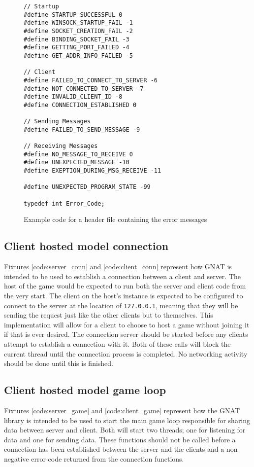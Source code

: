 \begin{figure}[!h]
  \centering
\begin{lstlisting}
// Startup
#define STARTUP_SUCCESSFUL 0
#define WINSOCK_STARTUP_FAIL -1
#define SOCKET_CREATION_FAIL -2
#define BINDING_SOCKET_FAIL -3
#define GETTING_PORT_FAILED -4
#define GET_ADDR_INFO_FAILED -5

// Client
#define FAILED_TO_CONNECT_TO_SERVER -6
#define NOT_CONNECTED_TO_SERVER -7
#define INVALID_CLIENT_ID -8
#define CONNECTION_ESTABLISHED 0

// Sending Messages
#define FAILED_TO_SEND_MESSAGE -9

// Receiving Messages
#define NO_MESSAGE_TO_RECEIVE 0
#define UNEXPECTED_MESSAGE -10
#define EXEPTION_DURING_MSG_RECEIVE -11

#define UNEXPECTED_PROGRAM_STATE -99

typedef int Error_Code;
\end{lstlisting}

  \caption{Example code for a header file containing the error messages}
  \label{fig:error_codes}
\end{figure}


\newpage
\subsection{Client hosted model connection}
Fixtures \ref{code:server_conn} and \ref{code:client_conn} represent how GNAT is intended to be used to establish a connection between a client and server. The host of the game would be expected to run both the server and client code from the very start. The client on the host's instance is expected to be configured to connect to the server at the location of \lstinline{127.0.0.1}, meaning that they will be sending the request just like the other clients but to themselves. This implementation will allow for a client to choose to host a game without joining it if that is ever desired. The connection server should be started before any clients attempt to establish a connection with it. Both of these calls will block the current thread until the connection process is completed. No networking activity should be done until this is finished.




\newpage
\subsection{Client hosted model game loop}
Fixtures \ref{code:server_game} and \ref{code:client_game} represent how the GNAT library is intended to be used to start the main game loop responsible for sharing data between server and client. Both will start two threads; one for listening for data and one for sending data. These functions should not be called before a connection has been established between the server and the clients and a non-negative error code returned from the connection functions.

